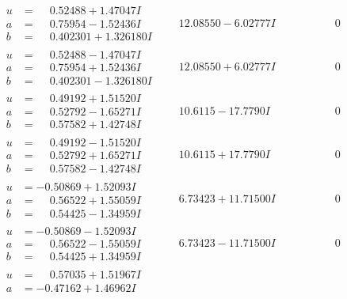 \documentclass[1p]{elsarticle_modified}
\theoremstyle{definition}
\begin{document}
$$\begin{array}{c|c|c}
 \hline 
\begin{aligned}
u &= \phantom{-}0.52488 + 1.47047 I \\
a &= \phantom{-}0.75954 - 1.52436 I \\
b &= \phantom{-}0.402301 + 1.326180 I\end{aligned}
 & \phantom{-}12.08550 - 6.02777 I & \phantom{-0.000000 } 0 \\ \hline\begin{aligned}
u &= \phantom{-}0.52488 - 1.47047 I \\
a &= \phantom{-}0.75954 + 1.52436 I \\
b &= \phantom{-}0.402301 - 1.326180 I\end{aligned}
 & \phantom{-}12.08550 + 6.02777 I & \phantom{-0.000000 } 0 \\ \hline\begin{aligned}
u &= \phantom{-}0.49192 + 1.51520 I \\
a &= \phantom{-}0.52792 - 1.65271 I \\
b &= \phantom{-}0.57582 + 1.42748 I\end{aligned}
 & \phantom{-}10.6115 - 17.7790 I & \phantom{-0.000000 } 0 \\ \hline\begin{aligned}
u &= \phantom{-}0.49192 - 1.51520 I \\
a &= \phantom{-}0.52792 + 1.65271 I \\
b &= \phantom{-}0.57582 - 1.42748 I\end{aligned}
 & \phantom{-}10.6115 + 17.7790 I & \phantom{-0.000000 } 0 \\ \hline\begin{aligned}
u &= -0.50869 + 1.52093 I \\
a &= \phantom{-}0.56522 + 1.55059 I \\
b &= \phantom{-}0.54425 - 1.34959 I\end{aligned}
 & \phantom{-}6.73423 + 11.71500 I & \phantom{-0.000000 } 0 \\ \hline\begin{aligned}
u &= -0.50869 - 1.52093 I \\
a &= \phantom{-}0.56522 - 1.55059 I \\
b &= \phantom{-}0.54425 + 1.34959 I\end{aligned}
 & \phantom{-}6.73423 - 11.71500 I & \phantom{-0.000000 } 0 \\ \hline\begin{aligned}
u &= \phantom{-}0.57035 + 1.51967 I \\
a &= -0.47162 + 1.46962 I \\

\end{aligned}
\end{array}$$
\end{document}
